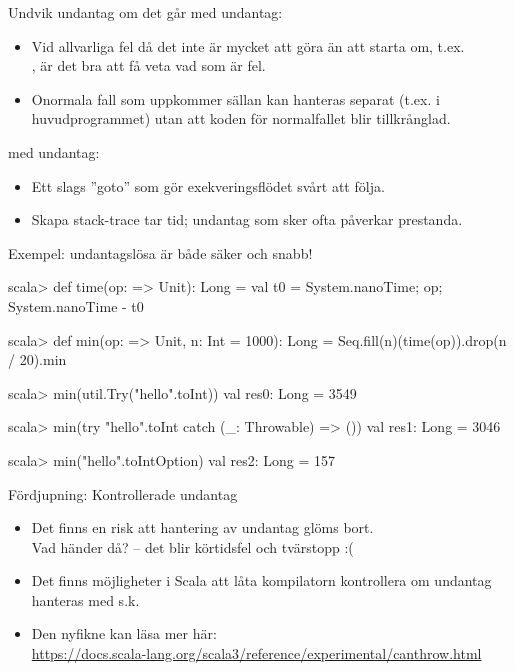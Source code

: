 \begin{Slide}{Undvik undantag om det går}
\SlideFontSmall
{} med undantag: 
\begin{itemize}
\item Vid allvarliga fel då det inte är mycket att göra än att starta om, t.ex.\\, är det bra att få veta vad som är fel.
\item Onormala fall som uppkommer sällan kan hanteras separat (t.ex. i huvudprogrammet) utan att koden för normalfallet blir tillkrånglad. 
\end{itemize}
 med undantag: 
\begin{itemize}
\item Ett slags ''goto'' som gör exekveringsflödet svårt att följa.
\item Skapa stack-trace tar tid; undantag som sker ofta påverkar prestanda.
\end{itemize}
\pause Exempel: undantagslösa  är både säker och snabb!
\begin{REPLsmall}
scala> def time(op: => Unit): Long = {val t0 = System.nanoTime; op; System.nanoTime - t0}

scala> def min(op: => Unit, n: Int = 1000): Long = Seq.fill(n)(time(op)).drop(n / 20).min

scala> min(util.Try("hello".toInt))
val res0: Long = 3549

scala> min(try "hello".toInt catch (_: Throwable) => ())
val res1: Long = 3046

scala> min("hello".toIntOption)
val res2: Long = 157
\end{REPLsmall}
\end{Slide}

\begin{Slide}{Fördjupning: Kontrollerade undantag}
\begin{itemize}
\item Det finns en risk att hantering av undantag glöms bort.\\Vad händer då?  -- det blir körtidsfel och tvärstopp :(
\item Det finns möjligheter i Scala att låta kompilatorn kontrollera om undantag hanteras med s.k.  
\item Den nyfikne kan läsa mer här: \\ \url{https://docs.scala-lang.org/scala3/reference/experimental/canthrow.html}
\end{itemize}
  
\end{Slide}
